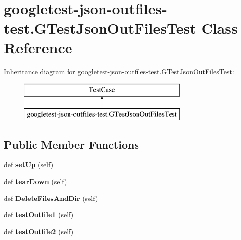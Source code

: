 \hypertarget{classgoogletest-json-outfiles-test_1_1GTestJsonOutFilesTest}{}\section{googletest-\/json-\/outfiles-\/test.G\+Test\+Json\+Out\+Files\+Test Class Reference}
\label{classgoogletest-json-outfiles-test_1_1GTestJsonOutFilesTest}
Inheritance diagram for googletest-\/json-\/outfiles-\/test.G\+Test\+Json\+Out\+Files\+Test\+:\begin{figure}[H]
\begin{center}
\leavevmode
\includegraphics[height=2.000000cm]{classgoogletest-json-outfiles-test_1_1GTestJsonOutFilesTest}
\end{center}
\end{figure}
\subsection*{Public Member Functions}
\begin{DoxyCompactItemize}
\item 
\mbox{\label{classgoogletest-json-outfiles-test_1_1GTestJsonOutFilesTest_a4d377334ff0527f037a83158faf9f92f}} 
def {\bfseries set\+Up} (self)
\item 
\mbox{\label{classgoogletest-json-outfiles-test_1_1GTestJsonOutFilesTest_a26ac17ebec0c197135a217794e11ce58}} 
def {\bfseries tear\+Down} (self)
\item 
\mbox{\label{classgoogletest-json-outfiles-test_1_1GTestJsonOutFilesTest_a382ecae11a217d1a972d694996485e4b}} 
def {\bfseries Delete\+Files\+And\+Dir} (self)
\item 
\mbox{\label{classgoogletest-json-outfiles-test_1_1GTestJsonOutFilesTest_a3efb5b896cde155ecbc766432acd81ec}} 
def {\bfseries test\+Outfile1} (self)
\item 
\mbox{\label{classgoogletest-json-outfiles-test_1_1GTestJsonOutFilesTest_a4ab6e77d7eb415cb339b42e9273730b7}} 
def {\bfseries test\+Outfile2} (self)
\end{DoxyCompactItemize}
